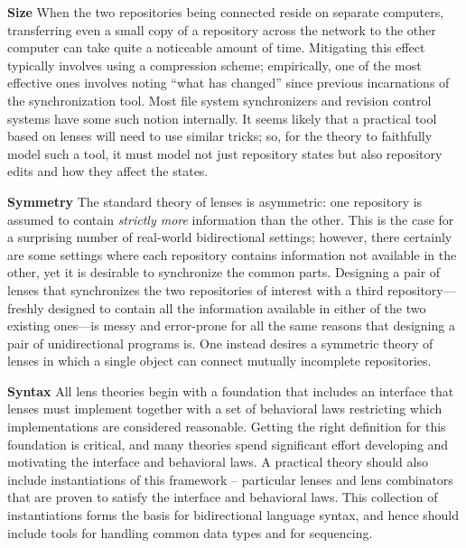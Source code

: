\documentclass{article}
\begin{document}
{\bf Size} When the two repositories being connected reside on separate computers,
transferring even a small copy of a repository across the network to the
other computer can take quite a noticeable amount of time. Mitigating this
effect typically involves using a compression scheme; empirically, one of
the most effective ones involves noting ``what has changed'' since previous
incarnations of the synchronization tool. Most file system synchronizers and
revision control systems have some such notion internally.  It seems likely
that a practical tool based on lenses will need to use similar tricks; so,
for the theory to faithfully model such a tool, it must model not just
repository states but also repository edits and how they affect the states.

{\bf Symmetry} The standard theory of lenses is asymmetric: one repository is assumed to
contain \emph{strictly more} information than the other. This is the case
for a surprising number of real-world bidirectional settings; however, there
certainly are some settings where each repository contains information not
available in the other, yet it is desirable to synchronize the common parts.
Designing a pair of lenses that synchronizes the two repositories of
interest with a third repository---freshly designed to contain all the
information available in either of the two existing ones---is messy and
error-prone for all the same reasons that designing a pair of unidirectional
programs is. One instead desires a symmetric theory of lenses in which a
single object can connect mutually incomplete repositories.

{\bf Syntax} All lens theories begin with a foundation that includes an interface that
lenses must implement together with a set of behavioral laws restricting
which implementations are considered reasonable. Getting the right
definition for this foundation is critical, and many theories spend
significant effort developing and motivating the interface and behavioral
laws. A practical theory should also include instantiations of this
framework -- particular lenses and lens combinators that are proven to
satisfy the interface and behavioral laws. This collection of instantiations
forms the basis for bidirectional language syntax, and hence should include
tools for handling common data types and for sequencing.
\end{document}
